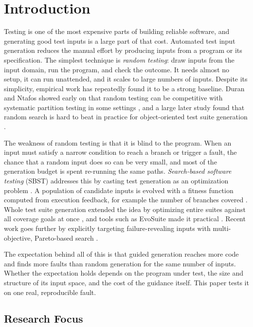 \documentclass[12pt,onecolumn]{IEEEtran}
\begin{document}
\section{Introduction}

Testing is one of the most expensive parts of building reliable software, and generating good test inputs is a large part of that cost. Automated test input generation reduces the manual effort by producing inputs from a program or its specification. The simplest technique is \emph{random testing}: draw inputs from the input domain, run the program, and check the outcome. It needs almost no setup, it can run unattended, and it scales to large numbers of inputs. Despite its simplicity, empirical work has repeatedly found it to be a strong baseline. Duran and Ntafos showed early on that random testing can be competitive with systematic partition testing in some settings \cite{duran1984}, and a large later study found that random search is hard to beat in practice for object-oriented test suite generation \cite{shamshiri2018}.

The weakness of random testing is that it is blind to the program. When an input must satisfy a narrow condition to reach a branch or trigger a fault, the chance that a random input does so can be very small, and most of the generation budget is spent re-running the same paths. \emph{Search-based software testing} (SBST) addresses this by casting test generation as an optimization problem \cite{mcminn2004}. A population of candidate inputs is evolved with a fitness function computed from execution feedback, for example the number of branches covered \cite{pargas1999}. Whole test suite generation extended the idea by optimizing entire suites against all coverage goals at once \cite{fraser2013,rojas2017}, and tools such as EvoSuite made it practical \cite{fraser2011}. Recent work goes further by explicitly targeting failure-revealing inputs with multi-objective, Pareto-based search \cite{sorokin2025}.

The expectation behind all of this is that guided generation reaches more code and finds more faults than random generation for the same number of inputs. Whether the expectation holds depends on the program under test, the size and structure of its input space, and the cost of the guidance itself. This paper tests it on one real, reproducible fault.

\subsection{Research Focus}
\end{document}
